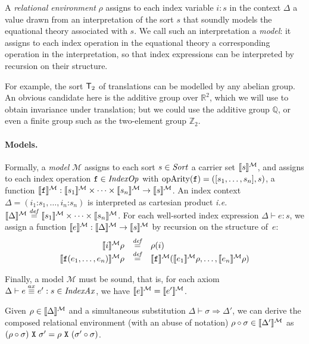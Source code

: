 A \emph{relational environment} $\rho$ assigns to each index variable $i:s$
in the context $\Delta$ a value drawn from an interpretation of
the sort $s$ that soundly models the equational theory associated with $s$. We call
such an interpretation a \emph{model}: it assigns to each index operation in the equational 
theory a corresponding operation in the interpretation, so that index expressions 
can be interpreted by recursion on their structure. 

For example, the sort $\mathsf{T}_2$ of translations can be modelled by
any abelian group. An obvious candidate here is the additive group over 
$\mathbb R^2$, which we will use to obtain invariance under translation;
but we could use the additive group $\mathbb Q$, or even a finite group such as the 
two-element group $\mathbb Z_2$. 

\paragraph{Models.}
Formally, a \emph{model} $\mathcal{M}$ assigns to each sort $s \in \mathit{Sort}$ a
carrier set $\llbracket s \rrbracket^{\mathcal{M}}$, and assigns to each index operation $\texttt{f}
\in \mathit{IndexOp}$ with $\mathrm{opArity}(\texttt{f}) =
([s_1,\ldots,s_n],s)$, a function $\llbracket \texttt{f} \rrbracket^{\mathcal{M}} :
\llbracket s_1 \rrbracket^{\mathcal{M}}\times\cdots\times\llbracket s_n \rrbracket^{\mathcal{M}} \to \llbracket s \rrbracket^{\mathcal{M}}$.
An index context $\Delta = (i_1\mathord:s_1,\ldots,i_n\mathord:s_n)$ is
interpreted as cartesian product \emph{i.e.} $\llbracket \Delta \rrbracket^{\mathcal{M}} \stackrel{\mathit{def}}= \llbracket s_1 \rrbracket^{\mathcal{M}}
\times\cdots \times \llbracket s_n \rrbracket^{\mathcal{M}}$. 
For each well-sorted index expression $\Delta \vdash
e : s$, we assign a function $\llbracket e \rrbracket^{\mathcal{M}} : \llbracket \Delta \rrbracket^{\mathcal{M}} \to
\llbracket s \rrbracket^{\mathcal{M}}$ by recursion on the structure of~$e$:
\[
\begin{array}{rcl}
\llbracket i \rrbracket^{\mathcal{M}} \rho & \stackrel{\mathit{def}}= & \rho(i)\\
\llbracket \textup{\texttt{f}}(e_1, \ldots, e_n) \rrbracket^{\mathcal{M}} \rho & \stackrel{\mathit{def}}= & \llbracket \textup{\texttt{f}} \rrbracket^{\mathcal{M}}(
\llbracket e_1 \rrbracket^{\mathcal{M}}\rho,\ldots,\llbracket e_n \rrbracket^{\mathcal{M}}\rho)
\end{array}
\]

Finally, a model $\mathcal{M}$
must be sound, that is, for each axiom $\Delta \vdash e \stackrel{ax}\equiv e' : s \in
\mathit{IndexAx}$, we have $\llbracket e \rrbracket^{\mathcal{M}} = \llbracket e' \rrbracket^{\mathcal{M}}$. 

\begin{example*}
\end{example*}

Given $\rho \in \llbracket \Delta \rrbracket^{\mathcal{M}}$ and a simultaneous substitution
$\Delta \vdash \sigma \Rightarrow \Delta'$, we can derive the composed
relational environment (with an abuse of notation) $\rho \circ \sigma
\in \llbracket \Delta' \rrbracket^{\mathcal{M}}$ as $(\rho \circ \sigma)\ \textup{\texttt{X}}\
\sigma' = \rho\ \textup{\texttt{X}}\ (\sigma' \circ \sigma)$.

